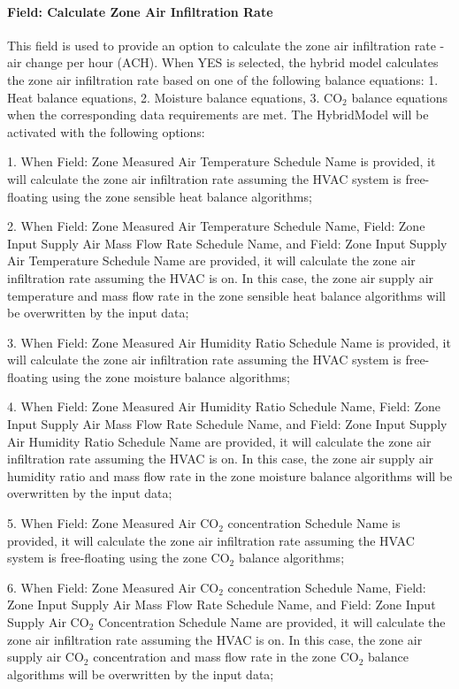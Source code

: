 \documentclass[11pt]{article}
\begin{document}
\paragraph{Field: Calculate Zone Air Infiltration Rate}\label{field-calculate-zone-air-infiltration-rate-hm}
This field is used to provide an option to calculate the zone air infiltration rate - air change per hour (ACH).
When YES is selected, the hybrid model calculates the zone air infiltration rate based on one of the following balance equations: 1. Heat balance equations, 2. Moisture balance equations, 3. CO$_2$ balance equations when the corresponding data requirements are met. The HybridModel will be activated with the following options:

1. When Field: Zone Measured Air Temperature Schedule Name is provided, it will calculate the zone air infiltration rate assuming the HVAC system is free-floating using the zone sensible heat balance algorithms;

2. When Field: Zone Measured Air Temperature Schedule Name, Field: Zone Input Supply Air Mass Flow Rate Schedule Name, and Field: Zone Input Supply Air Temperature Schedule Name are provided, it will calculate the zone air infiltration rate assuming the HVAC is on. In this case, the zone air supply air temperature and mass flow rate in the zone sensible heat balance algorithms will be overwritten by the input data;

3. When Field: Zone Measured Air Humidity Ratio Schedule Name is provided, it will calculate the zone air infiltration rate assuming the HVAC system is free-floating using the zone moisture balance algorithms;

4. When Field: Zone Measured Air Humidity Ratio Schedule Name, Field: Zone Input Supply Air Mass Flow Rate Schedule Name, and Field: Zone Input Supply Air Humidity Ratio Schedule Name are provided, it will calculate the zone air infiltration rate assuming the HVAC is on. In this case, the zone air supply air humidity ratio and mass flow rate in the zone moisture balance algorithms will be overwritten by the input data;

5. When Field: Zone Measured Air CO$_2$ concentration Schedule Name is provided, it will calculate the zone air infiltration rate assuming the HVAC system is free-floating using the zone CO$_2$ balance algorithms;

6. When Field: Zone Measured Air CO$_2$ concentration Schedule Name, Field: Zone Input Supply Air Mass Flow Rate Schedule Name, and Field: Zone Input Supply Air CO$_2$ Concentration Schedule Name are provided, it will calculate the zone air infiltration rate assuming the HVAC is on. In this case, the zone air supply air CO$_2$ concentration and mass flow rate in the zone CO$_2$ balance algorithms will be overwritten by the input data;
\end{document}
